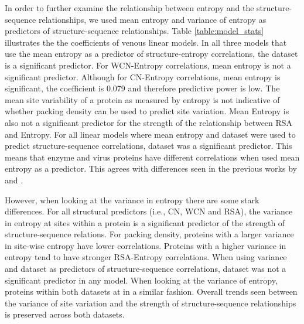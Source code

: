 \documentclass[12pt]{article}
\begin{document}
\indent In order to further examine the relationship between entropy and the structure-sequence relationships, we used mean entropy and variance of entropy as predictors of structure-sequence relationships. Table \ref{table:model_stats} illustrates the the coefficients of venous linear models. In all three models that use the mean entropy as a predictor of structure-entropy correlations, the dataset is a significant predictor. For WCN-Entropy correlations, mean entropy is not a significant predictor. Although for CN-Entropy correlations, mean entropy is significant, the coefficient is 0.079 and therefore predictive power is low. The mean site variability of a protein as measured by entropy is not indicative of whether packing density can be used to predict site variation.  Mean Entropy is also not a significant predictor for the strength of the relationship between RSA and Entropy. For all linear models where mean entropy and dataset were used to predict structure-sequence correlations, dataset was a significant predictor. This means that enzyme and virus proteins have different correlations when used mean entropy as a predictor. This agrees with differences seen in the previous works by \cite{Yehetal2014} and \cite{Shahmoradietal2014}.  

\indent However, when looking at the variance in entropy there are some stark differences. For all structural predictors (i.e., CN, WCN and RSA), the variance in entropy at sites within a protein is a significant predictor of the strength of structure-sequence relations. For packing density, proteins with a larger variance in site-wise entropy have lower correlations. Proteins with a higher variance in entropy tend to have stronger RSA-Entropy correlations. When using variance and dataset as predictors of structure-sequence correlations, dataset was not a significant predictor in any model. When looking at the variance of entropy, proteins within both datasets at in a similar fashion. Overall trends seen between the variance of site variation and the strength of structure-sequence relationships is preserved across both datasets. 
\end{document}
